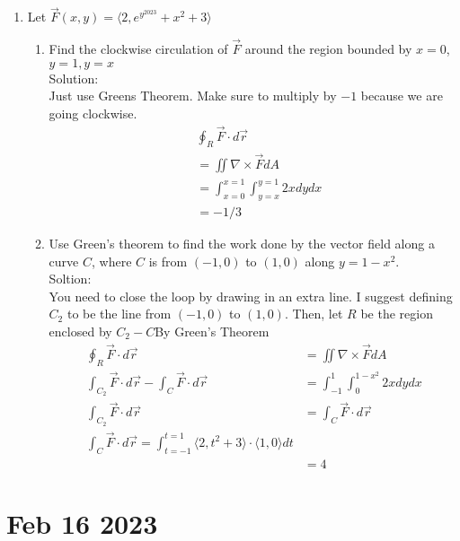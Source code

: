 \documentclass[11pt]{article}
\begin{document}
\begin{enumerate}
\begin{enumerate}
        \end{enumerate}
        \item Let $\vec{F}(x,y) = \langle 2, e^{y^{2023}} +x^{2}+3 \rangle$
        \begin{enumerate}
          \item Find the clockwise circulation of $\vec{F}$ around the region bounded
                by $x=0$, $y=1, y=x$ \\
                Solution: \\
                Just use Greens Theorem. Make sure to multiply by $-1$ because we
                are going clockwise.
                \begin{align*}
                  &\oint_{R} \vec{F} \cdot d\vec{r} \\
                  &= \iint \nabla \times \vec{F} dA \\
                  &= \int_{x=0}^{x=1}\int_{y=x}^{y=1} 2x dy dx \\
                  &= -1/3
                  \end{align*}
                \item Use Green’s theorem to find the work done by the vector field along a curve $C$, where $C$ is from $(-1, 0)$ to $(1, 0)$ along $y=1-x^{2}$.
                \\
                Soltion: \\
                You need to close the loop by drawing in an extra line. I suggest defining $C_{2}$ to be the line from $(-1, 0)$
                to $(1, 0)$. Then, let $R$ be the region enclosed by $C_{2}-C$By Green's Theorem
                \begin{align*}
                  \oint_{R} \vec{F} \cdot d\vec{r} &= \iint \nabla \times \vec{F} dA \\
                  \int_{C_{2}} \vec{F} \cdot d\vec{r} - \int_{C} \vec{F} \cdot d\vec{r} &= \int_{-1}^{1} \int_{0}^{1-x^{2}} 2x dy dx \\
                  \int_{C_{2}} \vec{F} \cdot d\vec{r} &= \int_{C} \vec{F} \cdot d\vec{r} \\
                  \int_{C} \vec{F} \cdot d\vec{r} = \int_{t=-1}^{t=1} \langle 2, t^{2} + 3 \rangle \cdot \langle 1 , 0 \rangle dt\\
                  &=4
                \end{align*}
                \end{enumerate}
\end{enumerate}
\section{Feb 16 2023}
\end{document}
